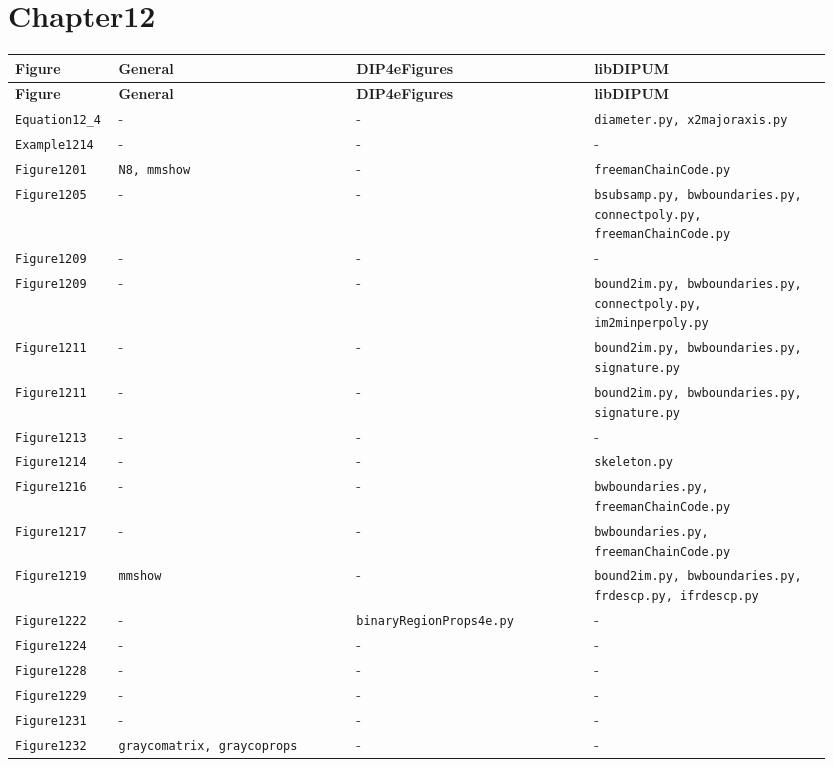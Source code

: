 \documentclass[10pt]{article}
\begin{document}
\section*{Chapter12}
\setlength{\tabcolsep}{4pt}
\begin{longtable}{p{0.11\linewidth} p{0.28\linewidth} p{0.28\linewidth} p{0.28\linewidth}}
\toprule
\textbf{Figure} & \textbf{General} & \textbf{DIP4eFigures} & \textbf{libDIPUM} \\
\midrule
\endfirsthead
\toprule
\textbf{Figure} & \textbf{General} & \textbf{DIP4eFigures} & \textbf{libDIPUM} \\
\midrule
\endhead
\bottomrule
\endfoot
\texttt{Equation12\_4} & - & - & \texttt{diameter.py, x2majoraxis.py} \\
\texttt{Example1214} & - & - & - \\
\texttt{Figure1201} & \texttt{N8, mmshow} & - & \texttt{freemanChainCode.py} \\
\texttt{Figure1205} & - & - & \texttt{bsubsamp.py, bwboundaries.py, connectpoly.py, freemanChainCode.py} \\
\texttt{Figure1209} & - & - & - \\
\texttt{Figure1209} & - & - & \texttt{bound2im.py, bwboundaries.py, connectpoly.py, im2minperpoly.py} \\
\texttt{Figure1211} & - & - & \texttt{bound2im.py, bwboundaries.py, signature.py} \\
\texttt{Figure1211} & - & - & \texttt{bound2im.py, bwboundaries.py, signature.py} \\
\texttt{Figure1213} & - & - & - \\
\texttt{Figure1214} & - & - & \texttt{skeleton.py} \\
\texttt{Figure1216} & - & - & \texttt{bwboundaries.py, freemanChainCode.py} \\
\texttt{Figure1217} & - & - & \texttt{bwboundaries.py, freemanChainCode.py} \\
\texttt{Figure1219} & \texttt{mmshow} & - & \texttt{bound2im.py, bwboundaries.py, frdescp.py, ifrdescp.py} \\
\texttt{Figure1222} & - & \texttt{binaryRegionProps4e.py} & - \\
\texttt{Figure1224} & - & - & - \\
\texttt{Figure1228} & - & - & - \\
\texttt{Figure1229} & - & - & - \\
\texttt{Figure1231} & - & - & - \\
\texttt{Figure1232} & \texttt{graycomatrix, graycoprops} & - & - \\

\end{longtable}
\end{document}
